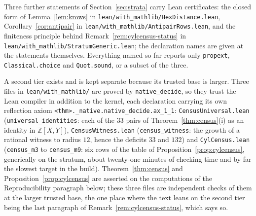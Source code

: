 \documentclass[11pt]{article}
\theoremstyle{definition}
\theoremstyle{remark}
\newcommand{\Z}{\mathbb{Z}}
\begin{document}
Three further statements of Section~\ref{sec:strata} carry Lean certificates:
the closed form of Lemma~\ref{lem:krows} in
\texttt{lean/with\_mathlib/HexDistance.lean}, Corollary~\ref{cor:antipair} in
\texttt{lean/with\_mathlib/AntipairRows.lean}, and the finiteness principle
behind Remark~\ref{rem:cylcensus-status} in
\texttt{lean/with\_mathlib/StratumGeneric.lean}; the declaration names are given
at the statements themselves. Everything named so far reports only
\texttt{propext}, \texttt{Classical.choice} and \texttt{Quot.sound}, or a
subset of the three.

A second tier exists and is kept separate because its trusted base is larger.
Three files in \texttt{lean/with\_mathlib/} are proved by
\texttt{native\_decide}, so they trust the Lean compiler in addition to the
kernel, each declaration carrying its own reflection axiom
\texttt{<thm>.\_native.native\_decide.ax\_1\_1}:
\texttt{CensusUniversal.lean} (\texttt{universal\_identities}: each of the $33$
pairs of Theorem~\ref{thm:census}(i) as an identity in $\Z[X,Y]$),
\texttt{CensusWitness.lean} (\texttt{census\_witness}: the growth of a rational
witness to radius $12$, hence the deficits $33$ and $132$) and
\texttt{CylCensus.lean} (\texttt{census\_m3} to \texttt{census\_m9}: six rows
of the table of Proposition~\ref{prop:cylcensus}, generically on the stratum,
about twenty-one minutes of checking time and by far the slowest target in the
build). Theorem~\ref{thm:census} and Proposition~\ref{prop:cylcensus} are
asserted on the computations of the Reproducibility paragraph below; these three
files are independent checks of them at the larger trusted base, the one place
where the text leans on the second tier being the last paragraph of
Remark~\ref{rem:cylcensus-status}, which says so.
\end{document}

